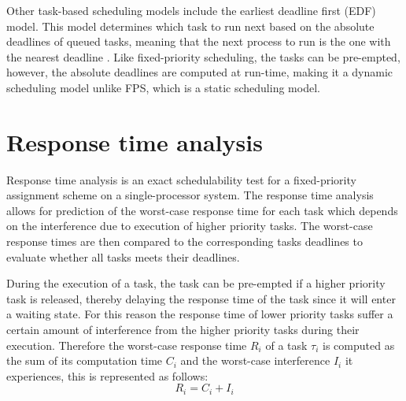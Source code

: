 Other task-based scheduling models include the earliest deadline first (EDF) model.
This model determines which task to run next based on the absolute deadlines of queued tasks, meaning that the next process to run is the one with the nearest deadline \cite{RealTimeEmbeddedSystems}.
Like fixed-priority scheduling, the tasks can be pre-empted, however, the absolute deadlines are computed at run-time, making it a dynamic scheduling model unlike FPS, which is a static scheduling model.

\section{Response time analysis}
Response time analysis is an exact schedulability test for a fixed-priority assignment scheme on a single-processor system. 
The response time analysis allows for prediction of the worst-case response time for each task which depends on the interference due to execution of higher priority tasks. 
The worst-case response times are then compared to the corresponding tasks deadlines to evaluate whether all tasks meets their deadlines. 

During the execution of a task, the task can be pre-empted if a higher priority task is released, thereby delaying the response time of the task since it will enter a waiting state. 
For this reason the response time of lower priority tasks suffer a certain amount of interference from the higher priority tasks during their execution. 
Therefore the worst-case response time $R_i$ of a task $\tau_i$ is computed as the sum of its computation time $C_i$ and the worst-case interference $I_i$ it experiences, this is represented as follows:
\begin{equation}\label{eq:responsetime}
R_i = C_i + I_i
\end{equation}

